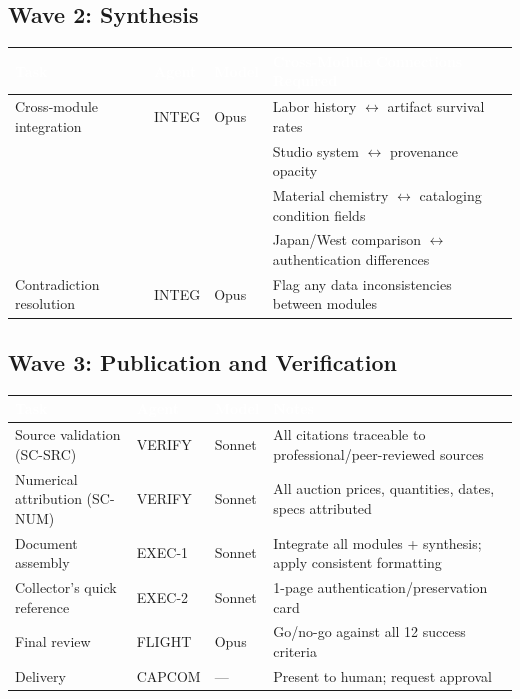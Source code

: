 \documentclass[11pt,letterpaper]{article}
\newcommand{\tableheader}[1]{\textbf{\sffamily\textcolor{white}{#1}}}
\begin{document}
\subsection{Wave 2: Synthesis}

\begin{center}
\begin{tabularx}{\textwidth}{L{3.5cm}L{2cm}L{2cm}X}
\toprule
{}
\tableheader{Task} & \tableheader{Agent} & \tableheader{Model} & \tableheader{Cross-Module Connections Required} \\
\midrule
Cross-module integration & INTEG & Opus & Labor history $\leftrightarrow$ artifact survival rates \\
& & & Studio system $\leftrightarrow$ provenance opacity \\
& & & Material chemistry $\leftrightarrow$ cataloging condition fields \\
& & & Japan/West comparison $\leftrightarrow$ authentication differences \\
Contradiction resolution & INTEG & Opus & Flag any data inconsistencies between modules \\
\bottomrule
\end{tabularx}
\end{center}

\subsection{Wave 3: Publication and Verification}

\begin{center}
\begin{tabularx}{\textwidth}{L{3.5cm}L{2cm}L{2cm}X}
\toprule
{}
\tableheader{Task} & \tableheader{Agent} & \tableheader{Model} & \tableheader{Notes} \\
\midrule
Source validation (SC-SRC) & VERIFY & Sonnet & All citations traceable to professional/peer-reviewed sources \\
Numerical attribution (SC-NUM) & VERIFY & Sonnet & All auction prices, quantities, dates, specs attributed \\
Document assembly & EXEC-1 & Sonnet & Integrate all modules + synthesis; apply consistent formatting \\
Collector's quick reference & EXEC-2 & Sonnet & 1-page authentication/preservation card \\
Final review & FLIGHT & Opus & Go/no-go against all 12 success criteria \\
Delivery & CAPCOM & --- & Present to human; request approval \\
\bottomrule
\end{tabularx}
\end{center}
\end{document}
